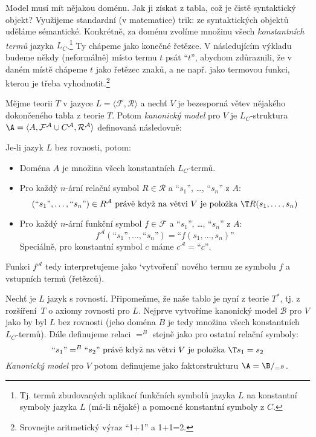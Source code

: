 Model musí mít nějakou doménu. Jak ji získat z tabla, což je čistě syntaktický objekt? Využijeme standardní (v matematice) trik: ze syntaktických objektů uděláme sémantické. Konkrétně, za doménu zvolíme množinu všech \emph{konstantních termů} jazyka $L_C$.\footnote{Tj. termů zbudovaných aplikací funkčních symbolů jazyka $L$ na konstantní symboly jazyka $L$ (má-li nějaké) a pomocné konstantní symboly z $C$.} Ty chápeme jako konečné řetězce. V následujícím výkladu budeme někdy (neformálně) místo termu $t$ psát ``$t$'', abychom zdůraznili, že v daném místě chápeme $t$ jako řetězec znaků, a ne např. jako termovou funkci, kterou je třeba vyhodnotit.\footnote{Srovnejte aritmetický výraz ``1+1'' a 1+1=2.}

\begin{definition}\label{definition:canonical-model-predicate}
Mějme teorii $T$ v jazyce $L=\langle\mathcal F,\mathcal R\rangle$ a nechť $V$ je bezesporná větev nějakého dokončeného tabla z teorie $T$. Potom \emph{kanonický model} pro $V$ je $L_C$-struktura $\A=\langle A,\mathcal F^\mathcal A\cup C^\mathcal A,\mathcal R^\mathcal A\rangle$ definovaná následovně:

Je-li jazyk $L$ bez rovnosti, potom:
\begin{itemize}
    \item Doména $A$ je množina všech konstantních $L_C$-termů.
    \item Pro každý $n$-ární relační symbol $R\in\mathcal R$ a ``$s_1$'', \dots, ``$s_n$'' z $A$:
    $$
    (\text{``$s_1$''},\dots,\text{``$s_n$''})\in R^\mathcal A\text{ právě když na větvi $V$ je položka $\T R(s_1,\dots,s_n)$}
    $$
    \item Pro každý $n$-ární funkční symbol $f\in\mathcal F$ a ``$s_1$'', \dots, ``$s_n$'' z $A$:
    $$
    f^\mathcal A(\text{``$s_1$''},\dots,\text{``$s_n$''})=\text{``$f(s_1,\dots,s_n)$''}
    $$
    Speciálně, pro konstantní symbol $c$ máme $c^\mathcal A=\text{``$c$''}$.
\end{itemize}
Funkci $f^\mathcal A$ tedy interpretujeme jako `vytvoření' nového termu ze symbolu $f$ a vstupních termů (řetězců). 

Nechť je $L$ jazyk s rovností. Připomeňme, že naše tablo je nyní z teorie $T^*$, tj. z rozšíření~$T$ o axiomy rovnosti pro $L$. Nejprve vytvoříme kanonický model $\mathcal B$ pro $V$ jako by byl $L$ bez rovnosti (jeho doména $B$ je tedy množina všech konstantních $L_C$-termů). Dále definujeme relaci $=^B$ stejně jako pro ostatní relační symboly:
$$
\text{``$s_1$''}=^B\text{``$s_2$''}\text{ právě když na větvi $V$ je položka $\T s_1=s_2$}
$$
\emph{Kanonický model} pro $V$ potom definujeme jako faktorstrukturu $\A=\B/_{=^B}$.
\end{definition}

